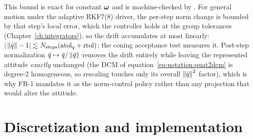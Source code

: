This bound is exact for constant $\bm{\omega}$ and is machine-checked by
. For general motion under the
adaptive RKF7(8) driver, the per-step norm change is bounded by that
step's local error, which the controller holds at the group tolerances
(Chapter~\ref{ch:integrators}), so the drift accumulates at most linearly:
$|\left\lVert \bar{q} \right\rVert - 1| \lesssim N_{\mathrm{steps}} (\mathrm{atol}_q +
\mathrm{rtol})$; the coning acceptance test measures it. Post-step
normalization $\bar{q} \mapsto \bar{q}/\left\lVert \bar{q} \right\rVert$ removes the
drift entirely while leaving the represented attitude \emph{exactly}
unchanged (the DCM of equation~\eqref{eq:notation:quat2dcm} is degree-2
homogeneous, so rescaling touches only its overall $\left\lVert \bar{q} \right\rVert^2$
factor), which is why FR-1 mandates it as the norm-control policy rather
than any projection that would alter the attitude.

\section{Discretization and implementation}
\label{sec:rigidbody:implementation}

